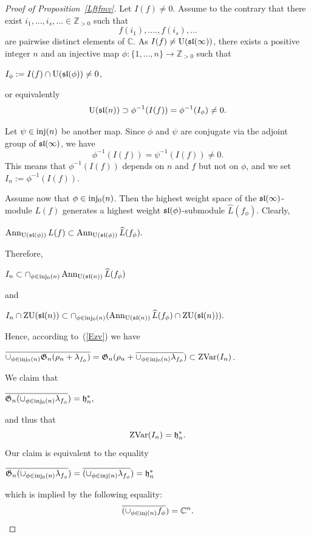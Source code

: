 \documentclass[10pt]{amsart}\oddsidemargin -1mm \evensidemargin -1mm \topmargin -15mm\headheight5mm \headsep 3.5mm \textheight 245mm\textwidth 170mm %
\theoremstyle{definition}\newtheorem{theorem}{Theorem}[section]\newtheorem{lemma}[theorem]{Lemma}\newtheorem{remark}[theorem]{Remark}\newtheorem{proposition}[theorem]{Proposition}\newtheorem{corollary}[theorem]{Corollary}\newtheorem{definition}[theorem]{Definition}\newtheorem{Ex}[theorem]{Example}
\newcounter{AP}
\begin{document}
\begin{proof}[Proof of Proposition~\ref{Lftfmv}]Let $I(f)\ne 0$. Assume to the contrary that there exist $i_1,...,i_s,...\in
\mathbb Z_{>0}$ such that $$f(i_1),...., f(i_s),...$$are pairwise distinct
elements of $\mathbb C$. As $I(f)\ne\operatorname{\mathrm{U}}(\frak{sl}(\infty))$, there exists a positive integer $n$ and an injective
map $\phi: \{1,..., n\}\to \mathbb Z_{>0}$ such
that\begin{center}$I_\phi:=I(f)\cap\operatorname{\mathrm{U}}(\frak{sl}(\phi))\ne
0$,\end{center} or equivalently
\begin{equation}\operatorname{\mathrm{U}}(\frak{sl}(n))\supset \phi^{-1}(I(f))=\phi^{-1}(I_\phi)\ne0.\label{Eslp}\end{equation}

Let $\psi\in\operatorname{\mathrm{inj}}(n)$ be another map. Since $\phi$ and $\psi$ are conjugate via the adjoint group of $\frak{sl}(\infty)$, we have
\begin{equation}\phi^{-1}(I(f))=\psi^{-1}(I(f))\ne0\label{Econj}.\end{equation}
This means that $\phi^{-1}(I(f))$ depends on $n$ and $f$ but not on $\phi$, and we set $I_n:=\phi^{-1}(I(f))$.

Assume now that $\phi\in\operatorname{\mathrm{inj_0}}(n)$. Then the
highest weight space of the $\frak{sl}(\infty)$-module $L(f)$ generates a highest weight $\frak{sl}(\phi)$-submodule
$\widehat{L}(f_\phi)$. Clearly,
\begin{center}$\operatorname{\mathrm{Ann}}_{\operatorname{\mathrm{U}}(\frak{sl}(\phi))}L(f)\subset
\operatorname{\mathrm{Ann}}_{\operatorname{\mathrm{U}}(\frak{sl}(\phi))}\widehat{L}(f_\phi).$\end{center}Therefore,\begin{center}$I_n\subset\cap_{\phi\in
\operatorname{\mathrm{inj_0}}(n)}\operatorname{\mathrm{Ann}}_{\operatorname{\mathrm{U}}(\frak{sl}(n))}\widehat{L}(f_\phi)$\end{center}
and\begin{center}$I_n\cap\operatorname{\mathrm{ZU}}(\frak{sl}(n))\subset\cap_{\phi\in
\operatorname{\mathrm{inj_0}}(n)}(\operatorname{\mathrm{Ann}}_{\operatorname{\mathrm{U}}(\frak{sl}(n))} \widehat{L}(f_\phi)\cap \operatorname{\mathrm{ZU}}(\frak{sl}(n))).$\end{center}Hence,
according to~(\ref{Ezv}) we have
\begin{center}$\overline{\cup_{\phi\in \operatorname{\mathrm{inj_0}}(n)}\frak
G_n(\rho_n+\lambda_{f_\phi})}=\frak G_n(\rho_n+\overline{\cup_{\phi\in
\operatorname{\mathrm{inj_0}}(n)}\lambda_{f_\phi}})\subset \operatorname{\mathrm{ZVar}}(I_n)$.\end{center}

We claim that
\begin{center}$\overline{\frak
G_n(\cup_{\phi\in\operatorname{\mathrm{inj_0}}(n)}\lambda_{f_\phi}})=\frak
h_n^*,$%
\end{center}and thus
that\begin{equation}\operatorname{\mathrm{ZVar}}(I_n)=\frak
h_n^*.\label{Efd1}\end{equation} Our claim is
equivalent to the equality \begin{center}$\overline{\frak
G_n(\cup_{\phi\in\operatorname{\mathrm{inj_0}}(n)}\lambda_{f_\phi}})=\overline{(\cup_{\phi\in\operatorname{\mathrm{inj}}(n)}\lambda_{f_\phi}})=\frak
h_n^*$%
\end{center} which is
implied by the following
equality:\begin{equation}\overline{(\cup_{\phi\in\operatorname{\mathrm{inj}}(n)}f_\phi})=\mathbb C^n\label{Efd}.\end{equation}


\end{proof}
\end{document}
